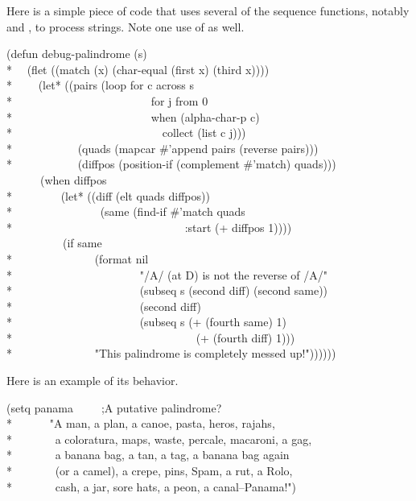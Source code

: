 Here is a simple piece of code that uses several of the sequence
functions, notably  and ,
to process strings.  Note one use of  as well.
\begin{lisp}
(defun debug-palindrome (s) \\*
~~(flet ((match (x) (char-equal (first x) (third x)))) \\*
~~~~(let* ((pairs (loop for c across s \\*
~~~~~~~~~~~~~~~~~~~~~~~~for j from 0 \\*
~~~~~~~~~~~~~~~~~~~~~~~~when (alpha-char-p c) \\*
~~~~~~~~~~~~~~~~~~~~~~~~~~collect (list c j))) \\*
~~~~~~~~~~~(quads (mapcar \#'append pairs (reverse pairs))) \\*
~~~~~~~~~~~(diffpos (position-if (complement \#'match) quads))) \\
~~~~~~(when diffpos \\*
~~~~~~~~(let* ((diff (elt quads diffpos)) \\*
~~~~~~~~~~~~~~~(same (find-if \#'match quads \\*
~~~~~~~~~~~~~~~~~~~~~~~~~~~~~~:start (+ diffpos 1)))) \\
~~~~~~~~~~(if same \\*
~~~~~~~~~~~~~~(format nil \\*
~~~~~~~~~~~~~~~~~~~~~~"/{\Xtilde}A/ (at {\Xtilde}D) is not the reverse of /{\Xtilde}A/" \\*
~~~~~~~~~~~~~~~~~~~~~~(subseq s (second diff) (second same)) \\*
~~~~~~~~~~~~~~~~~~~~~~(second diff) \\*
~~~~~~~~~~~~~~~~~~~~~~(subseq s (+ (fourth same) 1) \\*
~~~~~~~~~~~~~~~~~~~~~~~~~~~~~~~~(+ (fourth diff) 1))) \\*
~~~~~~~~~~~~~~"This palindrome is completely messed up!"))))))
\end{lisp}
Here is an example of its behavior.
\begin{lisp}
(setq panama~~~~~;\textrm{A putative palindrome?} \\*
~~~~~~"A man, a plan, a canoe, pasta, heros, rajahs, \\*
~~~~~~~a coloratura, maps, waste, percale, macaroni, a gag, \\*
~~~~~~~a banana bag, a tan, a tag, a banana bag again \\*
~~~~~~~(or a camel), a crepe, pins, Spam, a rut, a Rolo, \\*
~~~~~~~cash, a jar, sore hats, a peon, a canal--Panama!")
\end{lisp}
